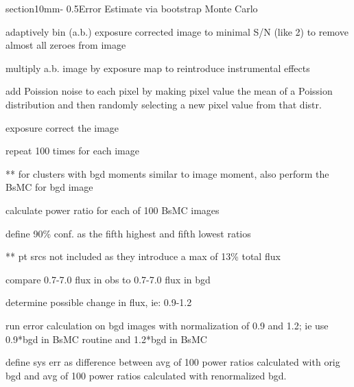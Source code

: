 \documentclass[letterpaper,12pt]{article}
\makeatletter
\renewcommand{\section}{\@startsection%
{section}{1}{0mm}{-\baselineskip}%
{0.5\baselineskip}{\normalfont\Large\bfseries}}%
\makeatother
\begin{document}
\section{Error Estimate via bootstrap Monte Carlo}
\begin{description}
\item adaptively bin (a.b.) exposure corrected image to minimal S/N (like 2) to remove almost all zeroes from image
\item multiply a.b. image by exposure map to reintroduce instrumental effects
\item add Poission noise to each pixel by making pixel value the mean of a Poission distribution and then randomly selecting a new pixel value from that distr.
\item exposure correct the image
\item repeat 100 times for each image

** for clusters with bgd moments similar to image moment, also perform the BsMC for bgd image

\item calculate power ratio for each of 100 BsMC images
\item define 90\% conf. as the fifth highest and fifth lowest ratios

** pt srcs not included as they introduce a max of 13\% total flux

\item compare 0.7-7.0 flux in obs to 0.7-7.0 flux in bgd
\item determine possible change in flux, ie: 0.9-1.2
\item run error calculation on bgd images with normalization of 0.9
and 1.2; ie use 0.9*bgd in BsMC routine and 1.2*bgd in BsMC
\item define sys err as difference between avg of 100 power ratios
calculated with orig bgd and avg of 100 power ratios calculated with
renormalized bgd.
\end{description}
\end{document}
